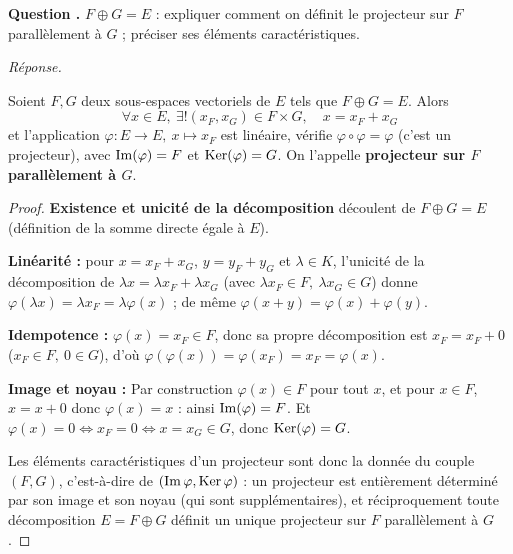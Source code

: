 \documentclass[11pt]{article}
\newcounter{qnum}
\newcommand{\question}[1]{%
\stepcounter{qnum}%
\bigskip
\noindent\textbf{Question \theqnum.} #1\par}
\newcommand{\reponse}{\noindent\textit{Réponse.}\ }
\begin{document}
\question{$F\oplus G=E$ : expliquer comment on définit le projecteur sur $F$ parallèlement à $G$ ; préciser ses éléments caractéristiques.}
\reponse
\begin{prop}
Soient $F,G$ deux sous-espaces vectoriels de $E$ tels que $F\oplus G=E$. Alors
\[\forall x\in E,\ \exists! (x_F,x_G)\in F\times G,\quad x=x_F+x_G\]
et l'application $\varphi:E\to E,\ x\mapsto x_F$ est linéaire, vérifie $\varphi\circ\varphi=\varphi$ (c'est un projecteur), avec $\operatorname{Im}(\varphi)=F$ et $\operatorname{Ker}(\varphi)=G$. On l'appelle \textbf{projecteur sur $F$ parallèlement à $G$}.
\end{prop}

\begin{proof}
\textbf{Existence et unicité de la décomposition} découlent de $F\oplus G=E$ (définition de la somme directe égale à $E$).

\textbf{Linéarité :} pour $x=x_F+x_G$, $y=y_F+y_G$ et $\lambda\in K$, l'unicité de la décomposition de $\lambda x=\lambda x_F+\lambda x_G$ (avec $\lambda x_F\in F,\ \lambda x_G\in G$) donne $\varphi(\lambda x)=\lambda x_F=\lambda\varphi(x)$ ; de même $\varphi(x+y)=\varphi(x)+\varphi(y)$.

\textbf{Idempotence :} $\varphi(x)=x_F\in F$, donc sa propre décomposition est $x_F=x_F+0$ ($x_F\in F,\ 0\in G$), d'où $\varphi(\varphi(x))=\varphi(x_F)=x_F=\varphi(x)$.

\textbf{Image et noyau :} Par construction $\varphi(x)\in F$ pour tout $x$, et pour $x\in F$, $x=x+0$ donc $\varphi(x)=x$ : ainsi $\operatorname{Im}(\varphi)=F$. Et $\varphi(x)=0 \iff x_F=0 \iff x=x_G\in G$, donc $\operatorname{Ker}(\varphi)=G$.

\medskip
Les éléments caractéristiques d'un projecteur sont donc la donnée du couple $(F,G)$, c'est-à-dire de $(\operatorname{Im}\varphi,\operatorname{Ker}\varphi)$ : un projecteur est entièrement déterminé par son image et son noyau (qui sont supplémentaires), et réciproquement toute décomposition $E=F\oplus G$ définit un unique projecteur sur $F$ parallèlement à $G$.
\end{proof}
\end{document}
